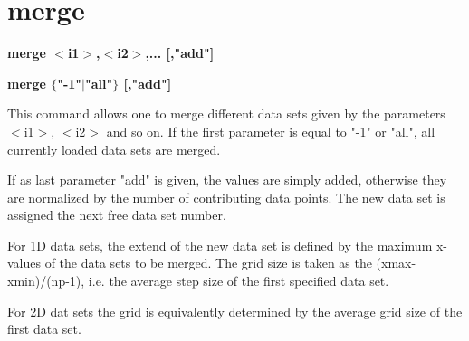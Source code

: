 \section{merge}
{\bf merge $ <$i1$> $,$ <$i2$> $,... [,"add"] \par }
{\bf merge $ \{$"-1"$| $"all"$\} $  [,"add"] \par }
\par
\vspace{3pt}
This command allows one to merge different data sets given by 
the parameters $ <$i1$> $, $ <$i2$> $ and so on. 
If the first parameter is equal to "-1" or "all", all currently 
loaded data sets are merged. 
\par
If as last parameter "add" 
is given, the values are simply added, otherwise they are 
normalized by the number of contributing data points. The new 
data set is assigned the next free data set number. 
\par
For 1D data sets, the extend of the new data set is defined by 
the maximum x-values of the data sets to be merged. The grid 
size is taken as the (xmax-xmin)/(np-1), i.e. the average step 
size of the first specified data set. 
\par
For 2D dat sets the grid is equivalently determined by the 
average grid size of the first data set. 
